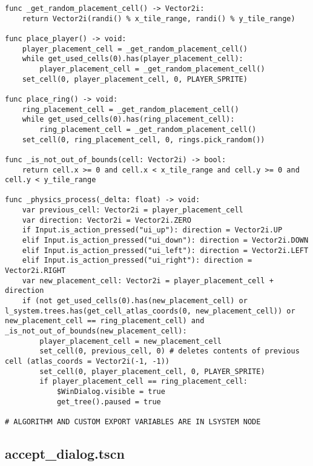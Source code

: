 \begin{lstlisting}
func _get_random_placement_cell() -> Vector2i:
	return Vector2i(randi() % x_tile_range, randi() % y_tile_range)

func place_player() -> void:
	player_placement_cell = _get_random_placement_cell()
	while get_used_cells(0).has(player_placement_cell):
		player_placement_cell = _get_random_placement_cell()
	set_cell(0, player_placement_cell, 0, PLAYER_SPRITE)

func place_ring() -> void:
	ring_placement_cell = _get_random_placement_cell()
	while get_used_cells(0).has(ring_placement_cell):
		ring_placement_cell = _get_random_placement_cell()
	set_cell(0, ring_placement_cell, 0, rings.pick_random())

func _is_not_out_of_bounds(cell: Vector2i) -> bool:
	return cell.x >= 0 and cell.x < x_tile_range and cell.y >= 0 and cell.y < y_tile_range

func _physics_process(_delta: float) -> void:
	var previous_cell: Vector2i = player_placement_cell
	var direction: Vector2i = Vector2i.ZERO
	if Input.is_action_pressed("ui_up"): direction = Vector2i.UP
	elif Input.is_action_pressed("ui_down"): direction = Vector2i.DOWN
	elif Input.is_action_pressed("ui_left"): direction = Vector2i.LEFT
	elif Input.is_action_pressed("ui_right"): direction = Vector2i.RIGHT
	var new_placement_cell: Vector2i = player_placement_cell + direction
	if (not get_used_cells(0).has(new_placement_cell) or l_system.trees.has(get_cell_atlas_coords(0, new_placement_cell)) or new_placement_cell == ring_placement_cell) and _is_not_out_of_bounds(new_placement_cell):
		player_placement_cell = new_placement_cell
		set_cell(0, previous_cell, 0) # deletes contents of previous cell (atlas_coords = Vector2i(-1, -1))
		set_cell(0, player_placement_cell, 0, PLAYER_SPRITE)
		if player_placement_cell == ring_placement_cell:
			$WinDialog.visible = true
			get_tree().paused = true

# ALGORITHM AND CUSTOM EXPORT VARIABLES ARE IN LSYSTEM NODE
\end{lstlisting}

\subsection{accept\_dialog.tscn}

